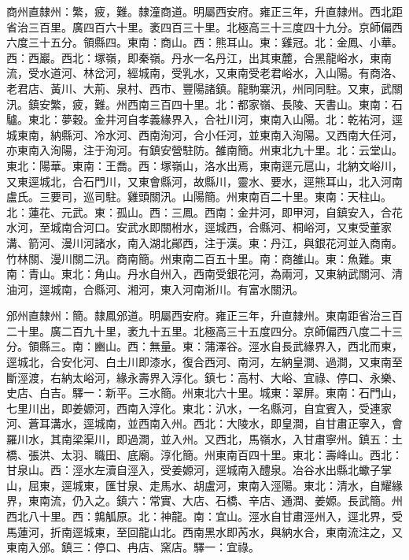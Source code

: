\begin{pinyinscope}
商州直隸州：繁，疲，難。隸潼商道。明屬西安府。雍正三年，升直隸州。西北距省治三百里。廣四百六十里。袤四百三十里。北極高三十三度四十九分。京師偏西六度三十五分。領縣四。東南：商山。西：熊耳山。東：雞冠。北：金鳳、小華。西：西巖。西北：塚嶺，即秦嶺。丹水一名丹江，出其東麓，合黑龍峪水，東南流，受水道河、林岔河，經城南，受乳水，又東南受老君峪水，入山陽。有商洛、老君店、黃川、大荊、泉村、西巿、豐陽諸鎮。龍駒寨汛，州同同駐。又東，武關汛。鎮安繁，疲，難。州西南三百四十里。北：都家嶺、長陵、天書山。東南：石驢。東北：夢穀。金井河自孝義緣界入，合社川河，東南入山陽。北：乾祐河，逕城東南，納縣河、冷水河、西南洵河，合小任河，並東南入洵陽。又西南大任河，亦東南入洵陽，注于洵河。有鎮安營駐防。雒南簡。州東北九十里。北：云堂山。東北：陽華。東南：王喬。西：塚嶺山，洛水出焉，東南逕元扈山，北納文峪川，又東逕城北，合石門川，又東會縣河，故縣川，靈水、要水，逕熊耳山，北入河南盧氏。三要司，巡司駐。雞頭關汛。山陽簡。州東南百二十里。東南：天柱山。北：蓮花、元武。東：孤山。西：三鳳。西南：金井河，即甲河，自鎮安入，合花水河，至城南合河口。安武水即關柎水，逕城西，合縣河、桐峪河，又東受董家溝、箭河、漫川河諸水，南入湖北鄖西，注于漢。東：丹江，與銀花河並入商南。竹林關、漫川關二汛。商南簡。州東南二百五十里。南：商雒山。東：魚難。東南：青山。東北：角山。丹水自州入，西南受銀花河，為兩河，又東納武關河、清油河，逕城南，合縣河、湘河，東入河南淅川。有富水關汛。

邠州直隸州：簡。隸鳳邠道。明屬西安府。雍正三年，升直隸州。東南距省治三百二十里。廣二百九十里，袤九十五里。北極高三十五度四分。京師偏西八度二十三分。領縣三。南：豳山。西：無量。東：蒲澤谷。涇水自長武緣界入，西北而東，逕城北，合安化河、白土川即漆水，復合西河、南河，左納皇澗、過澗，又東南至斷涇渡，右納太峪河，緣永壽界入淳化。鎮七：高村、大峪、宜祿、停口、永樂、史店、白吉。驛一：新平。三水簡。州東北六十里。城東：翠屏。東南：石門山，七里川出，即姜嫄河，西南入淳化。東北：汃水，一名縣河，自宜賓入，受連家河、蒼耳溝水，逕城南，並西南入州。西北：大陵水，即皇澗，自甘肅正寧入，會羅川水，其南梁渠川，即過澗，並入州。又西北，馬嶺水，入甘肅寧州。鎮五：土橋、張洪、太羽、職田、底廟。淳化簡。州東南百四十里。東北：壽峰山。西北：甘泉山。西：涇水左瀆自涇入，受姜嫄河，逕城南入醴泉。冶谷水出縣北蠍子掌山，屈東，逕城東，匯甘泉、走馬水、胡盧河，東南入涇陽。東北：清水，自耀緣界，東南流，仍入之。鎮六：常實、大店、石橋、辛店、通潤、姜嫄。長武簡。州西北八十里。西：鶉觚原。北：神龍。南：宜山。涇水自甘肅涇州入，逕北界，受馬蓮河，折南逕城東，至回龍山北。西南黑水即芮水，與納水合，東南流注之，又東南入邠。鎮三：停口、冉店、窯店。驛一：宜祿。


\end{pinyinscope}
